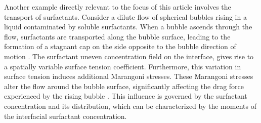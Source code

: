 Another example directly relevant to the focus of this article involves the transport of surfactants. 
Consider a dilute flow of spherical bubbles rising in a liquid contaminated by soluble surfactants. 
When a bubble ascends through the flow, surfactants are transported along the bubble surface, leading to the formation of a stagnant cap on the side opposite to the bubble direction of motion \citep{cuenot1997effects}.
The surfactant uneven concentration field on the interface, gives rise to a spatially variable surface tension coefficient. 
Furthermore, this variation in surface tension induces additional Marangoni stresses. %
These Marangoni stresses alter the flow around the bubble surface, significantly affecting the drag force experienced by the rising bubble \citep{cuenot1997effects,pesci2018computational}. 
This influence is governed by the surfactant concentration and its distribution, which can be characterized by the moments of the interfacial surfactant concentration.





